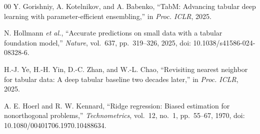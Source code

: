 \begin{thebibliography}{00}
Y. Gorishniy, A. Kotelnikov, and A. Babenko, ``TabM: Advancing tabular deep
learning with parameter-efficient ensembling,'' in \emph{Proc. ICLR}, 2025.

N. Hollmann \emph{et al.}, ``Accurate predictions on small data with a tabular
foundation model,'' \emph{Nature}, vol.~637, pp.~319--326, 2025,
doi: 10.1038/s41586-024-08328-6.

H.-J. Ye, H.-H. Yin, D.-C. Zhan, and W.-L. Chao, ``Revisiting nearest neighbor
for tabular data: A deep tabular baseline two decades later,'' in
\emph{Proc. ICLR}, 2025.

A. E. Hoerl and R. W. Kennard, ``Ridge regression: Biased estimation for
nonorthogonal problems,'' \emph{Technometrics}, vol.~12, no.~1,
pp.~55--67, 1970, doi: 10.1080/00401706.1970.10488634.
\end{thebibliography}
